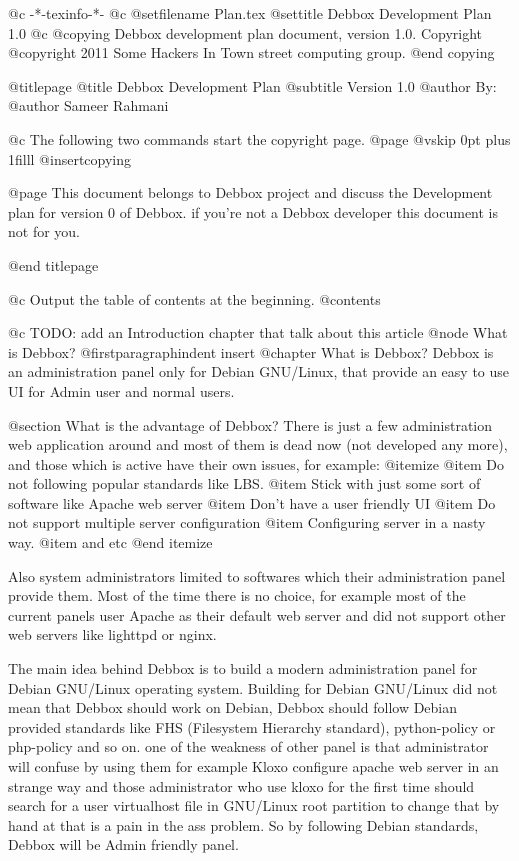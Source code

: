    @c -*-texinfo-*-
@c %
@setfilename Plan.tex
@settitle Debbox Development Plan 1.0
@c %
@copying
Debbox development plan document, version 1.0.
Copyright @copyright{} 2011 Some Hackers In Town street computing group.
@end copying

@titlepage
@title Debbox Development Plan
@subtitle Version 1.0
@author By:
@author Sameer Rahmani

@c The following two commands start the copyright page.
@page
@vskip 0pt plus 1filll
@insertcopying

@page
This document belongs to Debbox project and discuss the Development plan for version 0 of Debbox. if you're not 
a Debbox developer this document is not for you.

@end titlepage

@c Output the table of contents at the beginning.
@contents


@c TODO: add an Introduction chapter that talk about this article
@node What is Debbox?
@firstparagraphindent insert
@chapter What is Debbox?
Debbox is an administration panel only for Debian GNU/Linux, that provide an easy to use UI for Admin user and normal users. 

@section What is the advantage of Debbox?
There is just a few administration web application around and most of them is dead now (not developed any more), and those
which is active have their own issues, for example:
@itemize
@item
Do not following popular standards like LBS.
@item
Stick with just some sort of software like Apache web server
@item
Don't have a user friendly UI
@item
Do not support multiple server configuration
@item 
Configuring server in a nasty way.
@item
and etc
@end itemize

Also system administrators limited to softwares which their administration panel provide them.
Most of the time there is no choice, for example most of the current panels user Apache as their
default web server and did not support other web servers like lighttpd or nginx.

The main idea behind Debbox is to build a modern administration panel for Debian GNU/Linux operating 
system. Building for Debian GNU/Linux did not mean that Debbox should work on Debian, Debbox should
follow Debian provided standards like FHS (Filesystem Hierarchy standard), python-policy or php-policy
and so on. one of the weakness of other panel is that administrator will confuse by using them for example
Kloxo configure apache web server in an strange way and those administrator who use kloxo for the first time
should search for a user virtualhost file in GNU/Linux root partition to change that by hand at that is a pain 
in the ass problem. So by following Debian standards, Debbox will be Admin friendly panel. 

